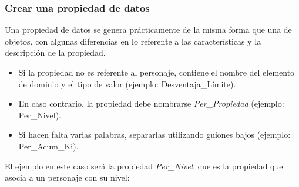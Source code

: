\subsubsection{Crear una propiedad de datos}\label{CreateDataProp}
Una propiedad de datos se genera prácticamente de la misma forma que una de objetos, con algunas diferencias en lo referente 
a las características y la descripción de la propiedad. 

\begin{itemize}
    \item Si la propiedad no es referente al personaje, contiene el nombre del elemento de dominio y el tipo de valor 
    (ejemplo: Desventaja\_Límite).
    \item En caso contrario, la propiedad debe nombrarse \textit{Per\_Propiedad} (ejemplo: Per\_Nivel).
    \item Si hacen falta varias palabras, separarlas utilizando guiones bajos (ejemplo: Per\_Acum\_Ki).
\end{itemize}

El ejemplo en este caso será la propiedad \textit{Per\_Nivel}, que es 
la propiedad que asocia a un personaje con su nivel:

